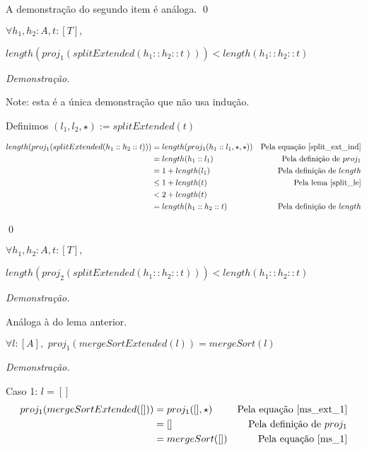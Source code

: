 \documentclass[12pt, oneside, a4paper,english,brazil]{abntex2}
\begin{document}
A demonstra\c{c}\~ao do segundo item \'e an\'aloga.
\qed

\begin{lema} \label{split_lt}
  $\forall h_{1}, h_{2} : A, t : [T],$

  \qquad $length(proj_{1}(splitExtended(h_{1} :: h_{2} :: t))) < length(h_{1}
    :: h_{2} :: t)$
\end{lema}

\noindent \textit{Demonstra\c{c}\~ao.}

Note: esta \'e a \'unica demonstra\c{c}\~ao que n\~ao usa indu\c{c}\~ao.

Definimos $(l_{1}, l_{2}, \star) := splitExtended(t)$

\begin{align*}
  length(proj_{1}(splitExtended(h_{1} :: h_{2} :: t))) &=
    length(proj_{1}(h_{1} :: l_{1}, \star, \star)) &\text{Pela equa\c{c}\~ao \ref{split_ext_ind}}\\
                                                       &= length(h_{1} :: l_{1}) &\text{Pela defini\c{c}\~ao de $proj_{1}$}\\
                                                       &= 1 + length(l_{1}) &\text{Pela defini\c{c}\~ao de $length$}\\
                                                       &\le 1 + length(t) &\text{Pela lema \ref{split_le}}\\
                                                       &< 2 + length(t)\\
  &= length(h_{1} :: h_{2} :: t) &\text{Pela defini\c{c}\~ao de $length$}
\end{align*}

\qed

\begin{lema}
  $\forall h_{1}, h_{2} : A, t : [T],$

  \qquad $length(proj_{2}(splitExtended(h_{1} :: h_{2} :: t))) < length(h_{1}
    :: h_{2} :: t)$
\end{lema}

\noindent \textit{Demonstra\c{c}\~ao.}

An\'aloga \`a do lema anterior.

\begin{teorema} \label{merge_sort_eq}
  $\forall l : [A], \,\, proj_{1}(mergeSortExtended(l)) = mergeSort(l)$
\end{teorema}

\noindent \textit{Demonstra\c{c}\~ao.}


Caso 1:  $l = []$
\begin{align*}
  proj_{1}(mergeSortExtended([])) &= proj_{1}([], \star) &\text{Pela equa\c{c}\~ao \ref{ms_ext_1}}\\
                                      &= [] &\text{Pela defini\c{c}\~ao de $proj_{1}$}\\
  &= mergeSort([]) &\text{Pela equa\c{c}\~ao \ref{ms_1}}
\end{align*}
\end{document}
